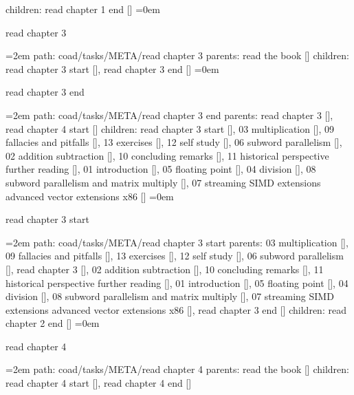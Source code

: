\smallskip
children: read chapter 1 end []
\smallskip
\leftskip=0em
\par\endgroup
\bigskip
{}
read chapter 3
\smallskip
\par\begingroup
\leftskip=2em
path: coad/tasks/META/read chapter 3
\smallskip
parents:  read the book []
\smallskip
children: read chapter 3 start [], read chapter 3 end []
\smallskip
\leftskip=0em
\par\endgroup
\bigskip
{}
read chapter 3 end
\smallskip
\par\begingroup
\leftskip=2em
path: coad/tasks/META/read chapter 3 end
\smallskip
parents:  read chapter 3 [], read chapter 4 start []
\smallskip
children: read chapter 3 start [], 03 multiplication [], 09 fallacies and pitfalls [], 13 exercises [], 12 self study [], 06 subword parallelism [], 02 addition subtraction [], 10 concluding remarks [], 11 historical perspective further reading [], 01 introduction [], 05 floating point [], 04 division [], 08 subword parallelism and matrix multiply [], 07 streaming SIMD extensions advanced vector extensions x86 []
\smallskip
\leftskip=0em
\par\endgroup
\bigskip
{}
read chapter 3 start
\smallskip
\par\begingroup
\leftskip=2em
path: coad/tasks/META/read chapter 3 start
\smallskip
parents:  03 multiplication [], 09 fallacies and pitfalls [], 13 exercises [], 12 self study [], 06 subword parallelism [], read chapter 3 [], 02 addition subtraction [], 10 concluding remarks [], 11 historical perspective further reading [], 01 introduction [], 05 floating point [], 04 division [], 08 subword parallelism and matrix multiply [], 07 streaming SIMD extensions advanced vector extensions x86 [], read chapter 3 end []
\smallskip
children: read chapter 2 end []
\smallskip
\leftskip=0em
\par\endgroup
\bigskip
{}
read chapter 4
\smallskip
\par\begingroup
\leftskip=2em
path: coad/tasks/META/read chapter 4
\smallskip
parents:  read the book []
\smallskip
children: read chapter 4 start [], read chapter 4 end []
